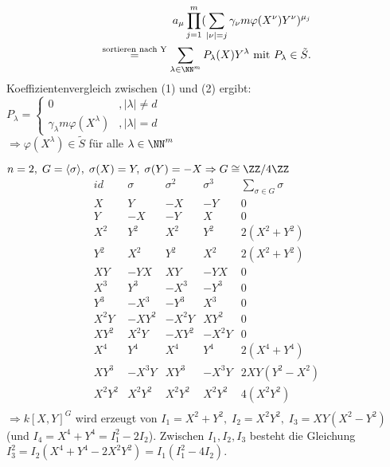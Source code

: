 \begin{Bew}
\begin{enumerate}
\begin{enumerate}
\begin{equation*}
\begin{split}
      a_{\mu} \prod_{j=1}^m (\sum_{|\nu| = j} \gamma_{\nu} m \varphi (X^{\nu}) Y
      ^{\nu})^{\mu_j}\\
      \overset{\text{sortieren nach Y}}{=} \sum_{\lambda \in
      \NN^m} P_{\lambda}(X)Y^{\lambda}\text{ mit }P_{\lambda} \in
      \tilde{S}.
      \end{split}
      \end{equation*}
      Koeffizientenvergleich zwischen (1) und (2) ergibt:\\
      $P_{\lambda}= \begin{cases} 0 &, |\lambda| \not= d\\ \gamma_{\lambda} m
      \varphi(X^{\lambda})&, |\lambda|=d \end{cases}$\\
      $\Rightarrow \varphi(X^{\lambda}) \in \tilde{S}$ für alle $\lambda \in \NN^m$
    \end{enumerate}
  \end{enumerate}
\end{Bew}

\begin{nnBsp}
  $n=2, \; G=\langle \sigma \rangle, \; \sigma(X) = Y, \; \sigma(Y) = -X
  \Rightarrow G \cong \ZZ/4\ZZ$
  \[
  \begin{array}{c|c|c|c|c}
    id & \sigma & \sigma^2 & \sigma^3 & \sum_{\sigma \in G} \sigma\\
    \hline
    X & Y & -X & -Y & 0\\
    Y & -X & -Y & X & 0\\
    X^2 & Y^2 & X^2 & Y^2 & 2(X^2+Y^2)\\
    Y^2 & X^2 & Y^2 & X^2 & 2(X^2+Y^2)\\
    XY & -YX & XY & -YX & 0\\
    X^3 & Y^3 & -X^3 & -Y^3 & 0\\
    Y^3 & -X^3 & -Y^3 & X^3 & 0\\
    X^2Y & -XY^2 & -X^2Y & X Y^2 & 0\\
    X Y^2 & X^2Y & -XY^2 & -X^2Y & 0\\
    X^4 & Y^4 & X^4 & Y^4 & 2(X^4+Y^4)\\
    XY^3 & -X^3Y & XY^3 & -X^3Y & 2XY(Y^2-X^2)\\
    X^2Y^2 & X^2Y^2& X^2Y^2& X^2Y^2 & 4(X^2Y^2)\\
  \end{array}
\]
  $\Rightarrow k[X,Y]^G$ wird erzeugt von $I_1 = X^2+Y^2, \; I_2 = X^2Y^2, \;
  I_3 = XY(X^2-Y^2)$ (und $I_4 = X^4 + Y^4 = I_1^2-2I_2$). Zwischen
  $I_1,I_2,I_3$ besteht die Gleichung $I_3^2 =
  I_2(X^4+Y^4-2X^2Y^2)=I_1(I_1^2-4I_2)$.
\end{nnBsp}
